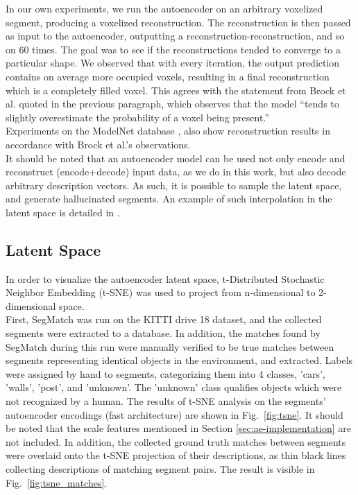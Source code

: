 In our own experiments, we run the autoencoder on an arbitrary voxelized segment, producing a voxelized reconstruction. The reconstruction is then passed as input to the autoencoder, outputting a reconstruction-reconstruction, and so on 60 times. The goal was to see if the reconstructions tended to converge to a particular shape. We observed that with every iteration, the output prediction contains on average more occupied voxels, resulting in a final reconstruction which is a completely filled voxel. This agrees with the statement from Brock et al. \cite{voxel-autoencoder} quoted in the previous paragraph, which observes that the model ``tends to slightly overestimate the probability of a voxel being present.''\\

Experiments on the ModelNet database \cite{modelnet}, also show reconstruction results in accordance with Brock et al.'s observations.\\

It should be noted that an autoencoder model can be used not only encode and reconstruct (encode+decode) input data, as we do in this work, but also decode arbitrary description vectors. As such, it is possible to sample the latent space, and generate hallucinated segments. An example of such interpolation in the latent space is detailed in \citet{voxel-autoencoder}.

\subsection{Latent Space}
\label{subsec:latent_space}

In order to visualize the autoencoder latent space, t-Distributed Stochastic Neighbor Embedding (t-SNE) \cite{tsne} was used to project from n-dimensional to 2-dimensional space. \\

First, SegMatch was run on the KITTI drive 18 dataset, and the collected segments were extracted to a database. In addition, the matches found by SegMatch during this run were manually verified to be true matches between segments representing identical objects in the environment, and extracted. Labels were assigned by hand to segments, categorizing them into 4 classes, 'cars', 'walls', 'post', and 'unknown'. The 'unknown' class qualifies objects which were not recognized by a human. The results of t-SNE analysis on the segments' autoencoder encodings (fast architecture) are shown in Fig.~\ref{fig:tsne}. It should be noted that the scale features mentioned in Section \ref{sec:ae-implementation} are not included. In addition, the collected ground truth matches between segments were overlaid onto the t-SNE projection of their descriptions, as thin black lines collecting descriptions of matching segment pairs. The result is visible in Fig.~\ref{fig:tsne_matches}.\\

